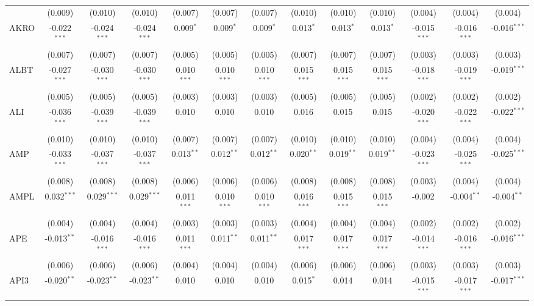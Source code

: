 \begin{table}[!htbp]
\begin{tabular}{@{\extracolsep{5pt}}lcccccccccccc}
  & (0.009) & (0.010) & (0.010) & (0.007) & (0.007) & (0.007) & (0.010) & (0.010) & (0.010) & (0.004) & (0.004) & (0.004) \\
 AKRO & -0.022$^{***}$ & -0.024$^{***}$ & -0.024$^{***}$ & 0.009$^{*}$ & 0.009$^{*}$ & 0.009$^{*}$ & 0.013$^{*}$ & 0.013$^{*}$ & 0.013$^{*}$ & -0.015$^{***}$ & -0.016$^{***}$ & -0.016$^{***}$ \\
  & (0.007) & (0.007) & (0.007) & (0.005) & (0.005) & (0.005) & (0.007) & (0.007) & (0.007) & (0.003) & (0.003) & (0.003) \\
 ALBT & -0.027$^{***}$ & -0.030$^{***}$ & -0.030$^{***}$ & 0.010$^{***}$ & 0.010$^{***}$ & 0.010$^{***}$ & 0.015$^{***}$ & 0.015$^{***}$ & 0.015$^{***}$ & -0.018$^{***}$ & -0.019$^{***}$ & -0.019$^{***}$ \\
  & (0.005) & (0.005) & (0.005) & (0.003) & (0.003) & (0.003) & (0.005) & (0.005) & (0.005) & (0.002) & (0.002) & (0.002) \\
 ALI & -0.036$^{***}$ & -0.039$^{***}$ & -0.039$^{***}$ & 0.010$^{}$ & 0.010$^{}$ & 0.010$^{}$ & 0.016$^{}$ & 0.015$^{}$ & 0.015$^{}$ & -0.020$^{***}$ & -0.022$^{***}$ & -0.022$^{***}$ \\
  & (0.010) & (0.010) & (0.010) & (0.007) & (0.007) & (0.007) & (0.010) & (0.010) & (0.010) & (0.004) & (0.004) & (0.004) \\
 AMP & -0.033$^{***}$ & -0.037$^{***}$ & -0.037$^{***}$ & 0.013$^{**}$ & 0.012$^{**}$ & 0.012$^{**}$ & 0.020$^{**}$ & 0.019$^{**}$ & 0.019$^{**}$ & -0.023$^{***}$ & -0.025$^{***}$ & -0.025$^{***}$ \\
  & (0.008) & (0.008) & (0.008) & (0.006) & (0.006) & (0.006) & (0.008) & (0.008) & (0.008) & (0.003) & (0.004) & (0.004) \\
 AMPL & 0.032$^{***}$ & 0.029$^{***}$ & 0.029$^{***}$ & 0.011$^{***}$ & 0.010$^{***}$ & 0.010$^{***}$ & 0.016$^{***}$ & 0.015$^{***}$ & 0.015$^{***}$ & -0.002$^{}$ & -0.004$^{**}$ & -0.004$^{**}$ \\
  & (0.004) & (0.004) & (0.004) & (0.003) & (0.003) & (0.003) & (0.004) & (0.004) & (0.004) & (0.002) & (0.002) & (0.002) \\
 APE & -0.013$^{**}$ & -0.016$^{***}$ & -0.016$^{***}$ & 0.011$^{***}$ & 0.011$^{**}$ & 0.011$^{**}$ & 0.017$^{***}$ & 0.017$^{***}$ & 0.017$^{***}$ & -0.014$^{***}$ & -0.016$^{***}$ & -0.016$^{***}$ \\
  & (0.006) & (0.006) & (0.006) & (0.004) & (0.004) & (0.004) & (0.006) & (0.006) & (0.006) & (0.003) & (0.003) & (0.003) \\
 API3 & -0.020$^{**}$ & -0.023$^{**}$ & -0.023$^{**}$ & 0.010$^{}$ & 0.010$^{}$ & 0.010$^{}$ & 0.015$^{*}$ & 0.014$^{}$ & 0.014$^{}$ & -0.015$^{***}$ & -0.017$^{***}$ & -0.017$^{***}$ \\

\end{tabular}
\end{table}
